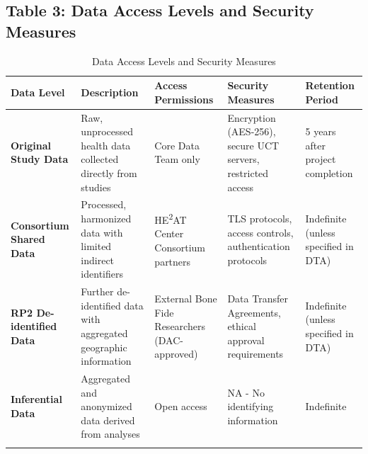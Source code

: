 \documentclass[12pt,a4paper,landscape]{article}
\begin{document}
\subsection*{Table 3: Data Access Levels and Security Measures}
\begin{longtable}{p{3.5cm}p{5cm}p{4.5cm}p{4cm}p{3cm}}
\toprule
\textbf{Data Level} & \textbf{Description} & \textbf{Access Permissions} & \textbf{Security Measures} & \textbf{Retention Period} \\
\midrule
\endhead

\textbf{Original Study Data} 
& Raw, unprocessed health data collected directly from studies 
& Core Data Team only 
& Encryption (AES-256), secure UCT servers, restricted access 
& 5 years after project completion \\
\midrule

\textbf{Consortium Shared Data} 
& Processed, harmonized data with limited indirect identifiers 
& HE\textsuperscript{2}AT Center Consortium partners 
& TLS protocols, access controls, authentication protocols 
& Indefinite (unless specified in DTA) \\
\midrule

\textbf{RP2 De-identified Data} 
& Further de-identified data with aggregated geographic information 
& External Bone Fide Researchers (DAC-approved) 
& Data Transfer Agreements, ethical approval requirements 
& Indefinite (unless specified in DTA) \\
\midrule

\textbf{Inferential Data} 
& Aggregated and anonymized data derived from analyses 
& Open access 
& NA - No identifying information 
& Indefinite \\
\bottomrule
\caption{Data Access Levels and Security Measures}
\end{longtable}
\clearpage
\end{document}

